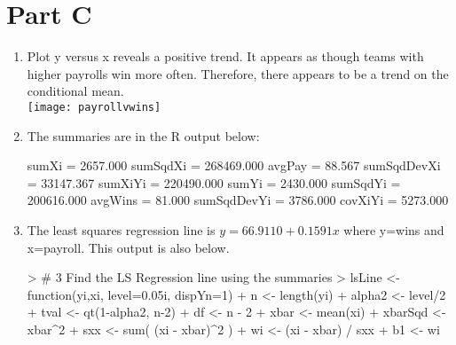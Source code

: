 \documentclass{article}
\begin{document}
\section*{Part C}
\begin{enumerate}
\item Plot y versus x reveals a positive trend. It appears as though teams with higher payrolls win more often. Therefore, there appears to be a trend on the conditional mean. \\  \texttt{[image: payrollvwins]}
\item The summaries are in the R output below:
\begin{Schunk}
\begin{Soutput}
 sumXi = 2657.000
 sumSqdXi = 268469.000
 avgPay = 88.567
 sumSqdDevXi = 33147.367
 sumXiYi = 220490.000
 sumYi = 2430.000
 sumSqdYi = 200616.000
 avgWins = 81.000
 sumSqdDevYi = 3786.000
 covXiYi = 5273.000
\end{Soutput}
\end{Schunk}
\item The least squares regression line is $ y = 66.9110  + 0.1591 x $ where y=wins and x=payroll. This output is also below. 
\begin{Schunk}
\begin{Sinput}
>   # 3 Find the LS Regression line using the summaries
> lsLine <- function(yi,xi, level=0.05i, dispYn=1){
+   n <- length(yi)
+   alpha2 <- level/2
+   tval <- qt(1-alpha2, n-2)
+   df <- n - 2
+   xbar <- mean(xi)
+   xbarSqd <- xbar^2
+   sxx <- sum( (xi - xbar)^2 )
+   wi <- (xi - xbar) / sxx
+   b1 <- wi %*% yi
}
\end{Sinput}
\end{Schunk}
\end{enumerate}
\end{document}
